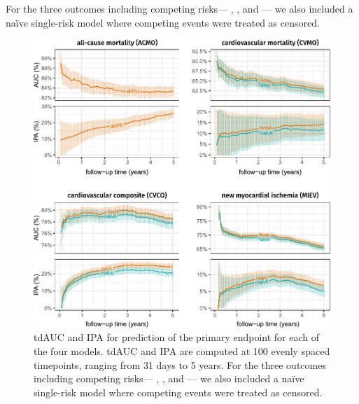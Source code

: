 For the three outcomes including competing risks---%
, , and ---%
we also included a naïve single-risk model where 
competing events were treated as censored.%



\begin{figure}
    \includegraphics{graphics/pmhnet-v2-metrics.pdf}
    \caption[Test-set performance of ]{%
        \Acf{tdAUC} and \acf{IPA} for prediction of the primary
        endpoint for each of the four  models.
        \ac{tdAUC} and \ac{IPA} are computed at 100 evenly spaced
        timepoints, ranging from 31 days to 5 years.
        For the three outcomes including competing risks---%
        , , and ---%
        we also included a naïve single-risk model where 
        competing events were treated as censored.%
    }
    \label{fig:pmhnet-v2-performance}
\end{figure}


